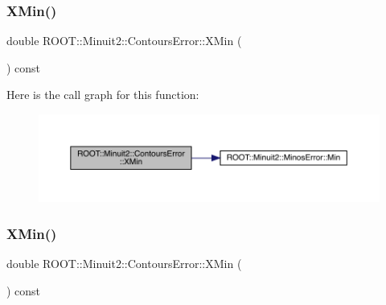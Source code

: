 \mbox{\label{classROOT_1_1Minuit2_1_1ContoursError_ac0dbac1ec08765a632908c88c5f24822}} 
\subsubsection{\texorpdfstring{XMin()}{XMin()}\hspace{0.1cm}{\footnotesize\ttfamily [1/3]}}
{\footnotesize\ttfamily double R\+O\+O\+T\+::\+Minuit2\+::\+Contours\+Error\+::\+X\+Min (\begin{DoxyParamCaption}{ }\end{DoxyParamCaption}) const\hspace{0.3cm}{\ttfamily [inline]}}

Here is the call graph for this function\+:
\nopagebreak
\begin{figure}[H]
\begin{center}
\leavevmode
\includegraphics[width=350pt]{d3/de9/classROOT_1_1Minuit2_1_1ContoursError_ac0dbac1ec08765a632908c88c5f24822_cgraph}
\end{center}
\end{figure}
\mbox{\label{classROOT_1_1Minuit2_1_1ContoursError_ac0dbac1ec08765a632908c88c5f24822}} 
\subsubsection{\texorpdfstring{XMin()}{XMin()}\hspace{0.1cm}{\footnotesize\ttfamily [2/3]}}
{\footnotesize\ttfamily double R\+O\+O\+T\+::\+Minuit2\+::\+Contours\+Error\+::\+X\+Min (\begin{DoxyParamCaption}{ }\end{DoxyParamCaption}) const\hspace{0.3cm}{\ttfamily [inline]}}

